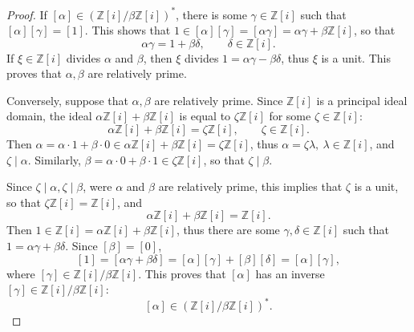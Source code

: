 \documentclass[11pt,a4paper]{article}
\newcommand{\Z}{\mathbb{Z}}
\begin{document}
\begin{proof} 
If $[\alpha] \in \left(\Z[i]/ \beta \Z[i] \right)^*$, there is some $\gamma \in \Z[i]$ such that $[\alpha] [\gamma ] = [1]$. This shows that $1 \in [\alpha] [\gamma] = [\alpha \gamma] = \alpha \gamma+ \beta \Z[i]$, so that
$$\alpha \gamma = 1 + \beta \delta,\qquad \delta \in \Z[i].$$
If $\xi \in \Z[i]$ divides $\alpha$ and $\beta$, then $\xi$ divides $1 = \alpha \gamma - \beta \delta$, thus $\xi$ is a unit. This proves that $\alpha, \beta$ are relatively prime.

\bigskip

Conversely, suppose that $\alpha, \beta$ are relatively prime. Since $\Z[i]$ is a principal ideal domain, the ideal $\alpha \Z[i] + \beta \Z[i]$ is equal to $\zeta \Z[i]$ for some $\zeta \in \Z[i]$:
$$\alpha \Z[i] + \beta \Z[i] = \zeta \Z[i],\qquad \zeta \in \Z[i].$$
Then $\alpha = \alpha\cdot 1 + \beta \cdot 0 \in \alpha \Z[i] + \beta \Z[i] = \zeta \Z[i]$, thus $\alpha = \zeta \lambda,\ \lambda \in \Z[i]$, and $\zeta \mid \alpha$. Similarly, $\beta  = \alpha \cdot 0 + \beta \cdot 1 \in \zeta \Z[i]$, so that $ \zeta \mid \beta $. 

Since $\zeta \mid \alpha, \zeta \mid \beta$, were $\alpha$ and $\beta$ are relatively prime, this implies that $\zeta$ is a unit, so that $\zeta \Z[i] = \Z[i]$, and
$$\alpha \Z[i] + \beta \Z[i] = \Z[i].$$
Then $1 \in \Z[i] = \alpha \Z[i] + \beta \Z[i] $, thus there are some $\gamma, \delta \in \Z[i]$ such that $1 =\alpha \gamma + \beta \delta$. Since $[\beta] = [0]$,
$$[1] = [\alpha \gamma + \beta \delta] = [\alpha][\gamma] + [\beta][\delta] = [\alpha][\gamma],$$
where $[\gamma] \in \Z[i]/\beta \Z[i]$. This proves that $[\alpha]$ has an inverse $[\gamma] \in \Z[i]/\beta \Z[i]$:
$$[\alpha] \in \left(\Z[i]/ \beta \Z[i] \right)^*.$$
\end{proof}
\end{document}
